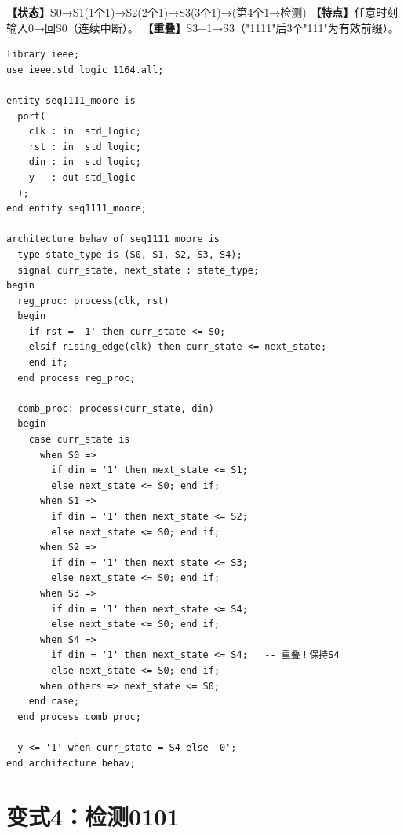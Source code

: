 \begin{detailbox}[完整教学]
\textbf{【状态】}S0→S1(1个1)→S2(2个1)→S3(3个1)→(第4个1→检测)
\textbf{【特点】}任意时刻输入0→回S0（连续中断）。
\textbf{【重叠】}S3+1→S3（"1111"后3个"111"为有效前缀）。

\begin{lstlisting}[caption={1111序列检测器——Moore型可重叠（5状态）}]
library ieee;
use ieee.std_logic_1164.all;

entity seq1111_moore is
  port(
    clk : in  std_logic;
    rst : in  std_logic;
    din : in  std_logic;
    y   : out std_logic
  );
end entity seq1111_moore;

architecture behav of seq1111_moore is
  type state_type is (S0, S1, S2, S3, S4);
  signal curr_state, next_state : state_type;
begin
  reg_proc: process(clk, rst)
  begin
    if rst = '1' then curr_state <= S0;
    elsif rising_edge(clk) then curr_state <= next_state;
    end if;
  end process reg_proc;

  comb_proc: process(curr_state, din)
  begin
    case curr_state is
      when S0 =>
        if din = '1' then next_state <= S1;
        else next_state <= S0; end if;
      when S1 =>
        if din = '1' then next_state <= S2;
        else next_state <= S0; end if;
      when S2 =>
        if din = '1' then next_state <= S3;
        else next_state <= S0; end if;
      when S3 =>
        if din = '1' then next_state <= S4;
        else next_state <= S0; end if;
      when S4 =>
        if din = '1' then next_state <= S4;   -- 重叠！保持S4
        else next_state <= S0; end if;
      when others => next_state <= S0;
    end case;
  end process comb_proc;

  y <= '1' when curr_state = S4 else '0';
end architecture behav;
\end{lstlisting}
\end{detailbox}


\section{变式4：检测0101}

